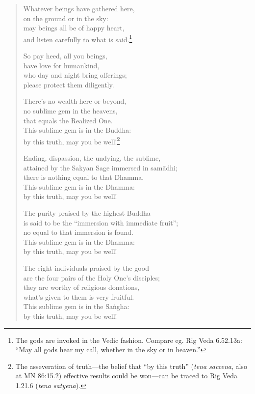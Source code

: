\documentclass[12pt,openany]{book}%
\begin{document}
\begin{verse}%
Whatever beings have gathered here, \\
on the ground or in the sky: \\
may beings all be of happy heart, \\
and listen carefully to what is said.\footnote{The gods are invoked in the Vedic fashion. Compare eg. Rig Veda 6.52.13a: “May all gods hear my call, whether in the sky or in heaven.” } 

So pay heed, all you beings, \\
have love for humankind, \\
who day and night bring offerings; \\
please protect them diligently. 

There’s no wealth here or beyond, \\
no sublime gem in the heavens, \\
that equals the Realized One. \\
This sublime gem is in the Buddha: \\
by this truth, may you be well!\footnote{The asseveration of truth—the belief that “by this truth” (\textit{tena saccena}, also at \href{https://suttacentral.net/mn86/en/sujato\#15.2}{MN 86:15.2}) effective results could be won—can be traced to Rig Veda 1.21.6 (\textit{tena satyena}). } 

Ending, dispassion, the undying, the sublime, \\
attained by the Sakyan Sage immersed in \textsanskrit{samādhi}; \\
there is nothing equal to that Dhamma. \\
This sublime gem is in the Dhamma: \\
by this truth, may you be well! 

The purity praised by the highest Buddha \\
is said to be the “immersion with immediate fruit”; \\
no equal to that immersion is found. \\
This sublime gem is in the Dhamma: \\
by this truth, may you be well! 

The eight individuals praised by the good \\
are the four pairs of the Holy One’s disciples; \\
they are worthy of religious donations, \\
what’s given to them is very fruitful. \\
This sublime gem is in the \textsanskrit{Saṅgha}: \\
by this truth, may you be well! 


\end{verse}
\end{document}
